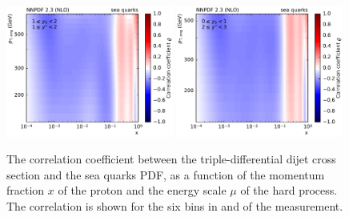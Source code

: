 \begin{figure}[htbp]
    \includegraphics[width=0.49\textwidth]{figures/pdf_constraints/corr_PTMAXEXPYS_YBYS_NLO_FINALBINS_NNPDF23_sea_quarks_ys1_0yb1_0_cl.pdf}\hfill
    \includegraphics[width=0.49\textwidth]{figures/pdf_constraints/corr_PTMAXEXPYS_YBYS_NLO_FINALBINS_NNPDF23_sea_quarks_ys2_0yb0_0_cl.pdf}\hfill
    \caption[Correlation between dijet cross section and sea quarks PDF]{
            The correlation coefficient between the triple-differential dijet cross
            section and the sea quarks PDF, as a function of the momentum fraction $x$ of the
            proton and the energy scale $\mu$ of the hard process. The correlation is shown
            for the six bins in \ystar and \yboost of the measurement.}
    \label{fig:pdfconstraints_sea_quarks}
\end{figure}

